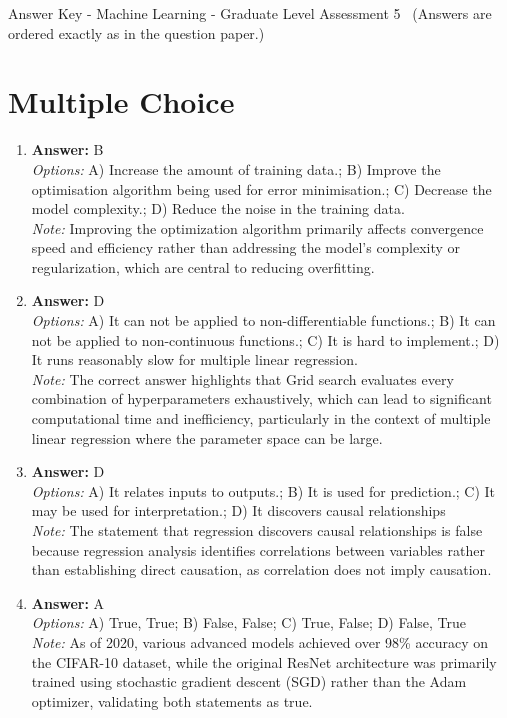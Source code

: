 \documentclass[12pt]{article}
\begin{document}
\begin{center}
Answer Key - Machine Learning - Graduate Level Assessment 5 \
\small (Answers are ordered exactly as in the question paper.)
\end{center}

\section*{Multiple Choice}
\begin{enumerate}[label=\arabic*.]
\item \textbf{Answer:} B
\\ \textit{Options:} A) Increase the amount of training data.; B) Improve the optimisation algorithm being used for error minimisation.; C) Decrease the model complexity.; D) Reduce the noise in the training data.
\\ \textit{Note:} Improving the optimization algorithm primarily affects convergence speed and efficiency rather than addressing the model's complexity or regularization, which are central to reducing overfitting.
\item \textbf{Answer:} D
\\ \textit{Options:} A) It can not be applied to non-differentiable functions.; B) It can not be applied to non-continuous functions.; C) It is hard to implement.; D) It runs reasonably slow for multiple linear regression.
\\ \textit{Note:} The correct answer highlights that Grid search evaluates every combination of hyperparameters exhaustively, which can lead to significant computational time and inefficiency, particularly in the context of multiple linear regression where the parameter space can be large.
\item \textbf{Answer:} D
\\ \textit{Options:} A) It relates inputs to outputs.; B) It is used for prediction.; C) It may be used for interpretation.; D) It discovers causal relationships
\\ \textit{Note:} The statement that regression discovers causal relationships is false because regression analysis identifies correlations between variables rather than establishing direct causation, as correlation does not imply causation.
\item \textbf{Answer:} A
\\ \textit{Options:} A) True, True; B) False, False; C) True, False; D) False, True
\\ \textit{Note:} As of 2020, various advanced models achieved over 98\% accuracy on the CIFAR-10 dataset, while the original ResNet architecture was primarily trained using stochastic gradient descent (SGD) rather than the Adam optimizer, validating both statements as true.

\end{enumerate}
\end{document}
